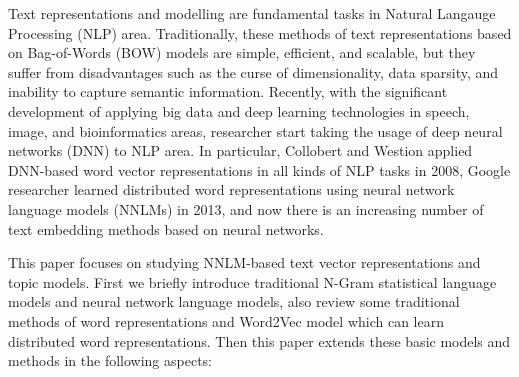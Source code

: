 \documentclass[master]{njuthesis}
\begin{document}
\begin{englishabstract}

Text representations and modelling are fundamental tasks in Natural Langauge Processing (NLP) area. Traditionally, these methods of text representations based on Bag-of-Words (BOW) models are simple, efficient, and scalable, but they suffer from disadvantages such as the curse of dimensionality, data sparsity, and inability to capture semantic information. Recently, with the significant development of applying big data and deep learning technologies in speech, image, and bioinformatics areas, researcher start taking the usage of deep neural networks (DNN) to NLP area. In particular, Collobert and Westion applied DNN-based word vector representations in all kinds of NLP tasks in 2008, Google researcher learned distributed word representations using neural network language models (NNLMs) in 2013, and now there is an increasing number of  text embedding methods based on neural networks.

This paper focuses on studying NNLM-based text vector representations and topic models. First we briefly introduce traditional N-Gram statistical language models and neural network language models, also review some traditional methods of word representations and Word2Vec model which can learn distributed word representations. Then this paper extends these basic models and methods in the following aspects:


\end{englishabstract}
\end{document}
